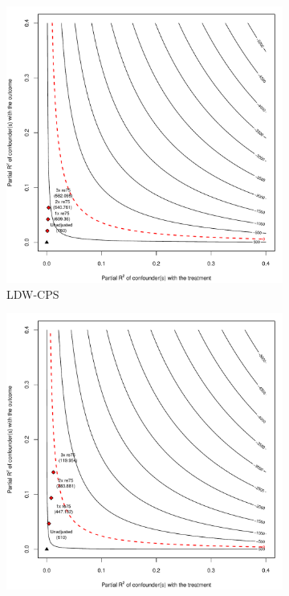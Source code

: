 \documentclass[letterpaper,12pt,leqno]{article}
\begin{document}
\begin{figure}[!ht]
    \caption{Sensitivity Analyses for Trimmed NSW-CPS and NSW-PSID}\label{fig:nsw.sens}
    \begin{minipage}[c]{1\textwidth}
        \centering
        \begin{subfigure}{0.45\linewidth}
            \includegraphics[width=\linewidth]{sens_nsw_cps.pdf}
            \caption{LDW-CPS}
        \end{subfigure}\hspace{1em}
        \begin{subfigure}{0.45\linewidth}
            \includegraphics[width=\linewidth]{sens_nsw_psid.pdf}

\end{subfigure}
\end{minipage}
\end{figure}
\end{document}

